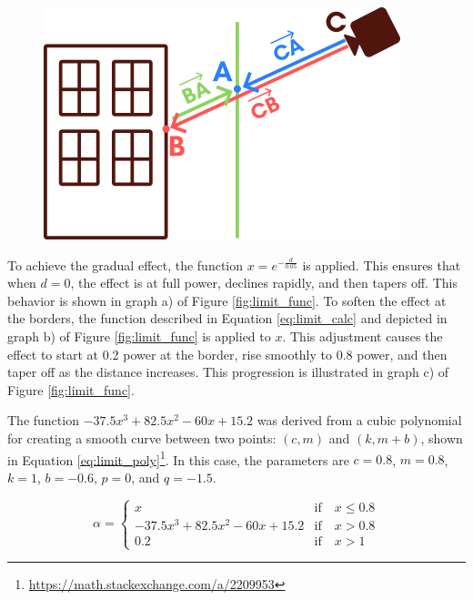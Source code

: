         \begin{figure}[h!]
            \centering
            \includegraphics[width=.5\textwidth]{figures/limit_calc.png}
            \label{fig:limit_calc}
        \end{figure}
    
        To achieve the gradual effect, the function \( x = e^{-\frac{d}{0.05}} \) is applied. This ensures that when \( d = 0 \), the effect is at full power, declines rapidly, and then tapers off. This behavior is shown in graph a) of Figure \ref{fig:limit_func}. To soften the effect at the borders, the function described in Equation \ref{eq:limit_calc} and depicted in graph b) of Figure \ref{fig:limit_func} is applied to \( x \). This adjustment causes the effect to start at 0.2 power at the border, rise smoothly to 0.8 power, and then taper off as the distance increases. This progression is illustrated in graph c) of Figure \ref{fig:limit_func}.

        The function \( -37.5 x^3 + 82.5 x^2 - 60 x + 15.2 \) was derived from a cubic polynomial for creating a smooth curve between two points: \((c, m)\) and \((k, m + b)\), shown in Equation \ref{eq:limit_poly}\footnote{\url{https://math.stackexchange.com/a/2209953}}. In this case, the parameters are \( c = 0.8 \), \( m = 0.8 \), \( k = 1 \), \( b = -0.6 \), \( p = 0 \), and \( q = -1.5 \).

        \begin{figure}[h]
        \begin{equation} \label{eq:limit_calc}
        \alpha =
        \begin{cases}
            x & \text{if} \quad x \leq 0.8 \\
            -37.5 x^3 + 82.5 x^2 - 60 x + 15.2 & \text{if} \quad x > 0.8 \\
            0.2 & \text{if} \quad x > 1
        \end{cases}
        \end{equation}
        \end{figure}

